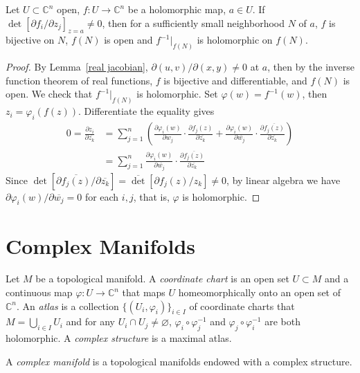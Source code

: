 \begin{thm}
    Let $U\subset\mathbb{C}^n$ open, $f:U\to\mathbb{C}^n$ be a holomorphic map, $a\in U$.
    If $\det[\partial{f_i}/\partial{z_j}]_{z=a}\neq 0$, then for a sufficiently small neighborhood $N$ of $a$, $f$ is bijective on $N$, $f(N)$ is open and $f^{-1}|_{f(N)}$ is holomorphic on $f(N)$.
\end{thm}
\begin{proof}
    By Lemma~\ref{real jacobian}, $\partial(u,v)/\partial(x,y)\neq 0$ at $a$, then by the inverse function theorem of real functions, $f$ is bijective and differentiable, and $f(N)$ is open.
    We check that $f^{-1}|_{f(N)}$ is holomorphic.
    Set $\varphi(w)=f^{-1}(w)$, then $z_i=\varphi_i(f(z))$.
    Differentiate the equality gives
    \begin{align*}
        0=\frac{\partial z_i}{\partial\overline{z_k}}&=\sum_{j=1}^n\left(\frac{\partial\varphi_i(w)}{\partial w_j}\cdot\frac{\partial f_j(z)}{\partial\overline{z_k}}+\frac{\partial\varphi_i(w)}{\partial\overline{w_j}}\cdot\frac{\partial\overline{f_j(z)}}{\partial\overline{z_k}}\right)\\
        &=\sum_{j=1}^n\frac{\partial\varphi_i(w)}{\partial\overline{w_j}}\cdot\frac{\partial\overline{f_j(z)}}{\partial\overline{z_k}}
    \end{align*}
    Since $\det[\partial\overline{f_j(z)}/\partial\overline{z_k}]=\overline\det[\partial f_j(z)/z_k]\neq 0$, by linear algebra we have $\partial\varphi_i(w)/\partial\overline{w_j}=0$ for each $i,j$, that is, $\varphi$ is holomorphic.
\end{proof}

\section{Complex Manifolds}

\begin{defn}
    Let $M$ be a topological manifold.
    A \emph{coordinate chart} is an open set $U\subset M$ and a continuous map $\varphi:U\to\mathbb{C}^n$ that maps $U$ homeomorphically onto an open set of $\mathbb{C}^n$.
    An \emph{atlas} is a collection $\{(U_i,\varphi_i)\}_{i\in I}$ of coordinate charts that $M=\bigcup_{i\in I}U_i$ and for any $U_i\cap U_j\neq\varnothing$, $\varphi_i\circ\varphi_j^{-1}$ and $\varphi_j\circ\varphi_i^{-1}$ are both holomorphic.
    A \emph{complex structure} is a maximal atlas.

    A \emph{complex manifold} is a topological manifolds endowed with a complex structure.
\end{defn}

